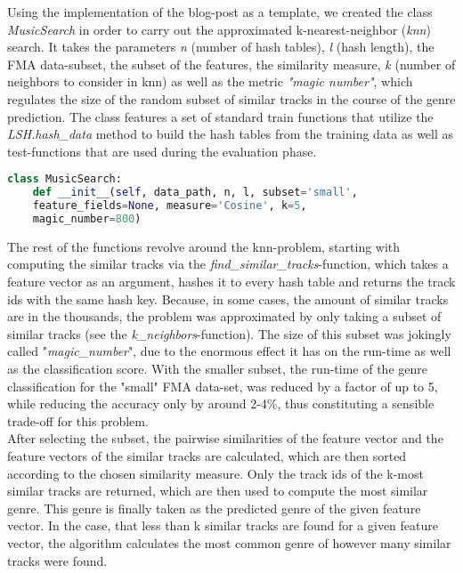 \documentclass[11pt]{article}
\begin{document}
Using the implementation of the blog-post as a template, we created the class \textit{MusicSearch} in order to carry out the approximated k-nearest-neighbor (\textit{knn}) search. It takes the parameters \textit{n} (number of hash tables), \textit{l} (hash length), the FMA data-subset, the subset of the features, the similarity measure,\textit{ k} (number of neighbors to consider in knn) as well as the metric \textit{"magic number"}, which regulates the size of the random subset of similar tracks in the course of the genre prediction.
The class features a set of standard train functions that utilize the\textit{ LSH.hash\_data} method to build the hash tables from the training data as well as test-functions that are used during the evaluation phase. 

\begin{file}
\begin{lstlisting}[language=Python]
class MusicSearch:
    def __init__(self, data_path, n, l, subset='small', 
    feature_fields=None, measure='Cosine', k=5, 
    magic_number=800)
\end{lstlisting}
\end{file}


The rest of the functions revolve around the knn-problem, starting with computing the similar tracks via the \textit{find\_similar\_tracks}-function, which takes a feature vector as an argument, hashes it to every hash table and returns the track ids with the same hash key. Because, in some cases, the amount of similar tracks are in the thousands, the problem was approximated by only taking a subset of similar tracks (see the \textit{k\_neighbors}-function). The size of this subset was jokingly called "\textit{magic\_number}", due to the enormous effect it has on the run-time as well as the classification score. With the smaller subset, the run-time of the genre classification for the "small" FMA data-set, was reduced by a factor of up to 5, while reducing the accuracy only by around 2-4\%, thus constituting a sensible trade-off for this problem. \\

After selecting the subset, the pairwise similarities of the feature vector and the feature vectors of the similar tracks are calculated, which are then  sorted according to the chosen similarity measure. Only the track ids of the k-most similar tracks are returned, which are then used to compute the most similar genre. This genre is finally taken as the predicted genre of the given feature vector.  
In the case,  that less than k similar tracks are found for a given feature vector, the algorithm calculates the most common genre of however many similar tracks were found.
\end{document}
